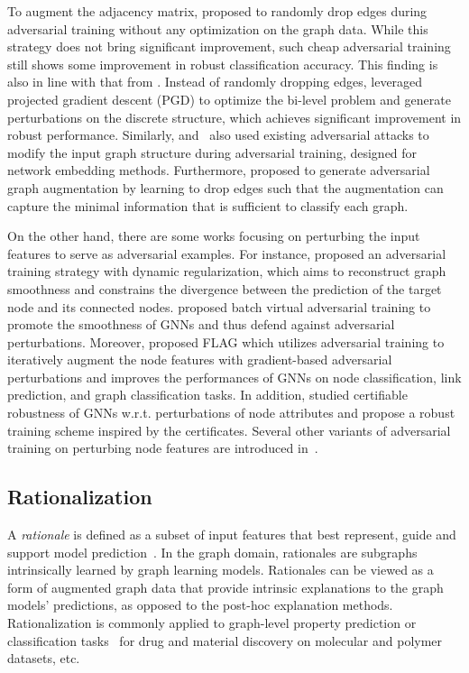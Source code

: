 \documentclass[11pt]{article}
\begin{document}
To augment the adjacency matrix, \citet{dai2018adversarial} proposed to randomly drop edges during adversarial training without any optimization on the graph data. While this strategy does not bring significant improvement, such cheap adversarial training still shows some improvement in robust classification accuracy. This finding is also in line with that from \citet{zugner2020certifiable}. Instead of randomly dropping edges, \citet{xu2019topology} leveraged projected gradient descent (PGD) to optimize the bi-level problem and generate perturbations on the discrete structure, which achieves significant improvement in robust performance. Similarly, \citet{chen2019can} and~\citet{dai2019adversarial} also used existing adversarial attacks to modify the input graph structure during adversarial training, designed for network embedding methods. Furthermore, \citet{suresh2021adversarial} proposed to generate adversarial graph augmentation by learning to drop edges such that the augmentation can capture the minimal information that is sufficient to classify each graph. 

On the other hand, there are some works focusing on perturbing the input features to serve as adversarial examples. For instance, \citet{feng2019graph} proposed an adversarial training strategy with dynamic regularization, which aims to reconstruct graph smoothness and constrains the divergence between the prediction of the target node and its connected nodes. \citet{deng2019batch} proposed batch virtual adversarial training to promote the smoothness of GNNs and thus defend against adversarial perturbations. Moreover, \citet{kong2022robust} proposed FLAG which utilizes adversarial training to iteratively augment the node features with gradient-based adversarial perturbations and improves the performances of GNNs on node classification, link prediction, and graph classification tasks. In addition, \citet{zugner2019certifiable} studied certifiable robustness of GNNs w.r.t. perturbations of node attributes and propose a robust training scheme inspired by the certificates.
Several other variants of adversarial training on perturbing node features are introduced in~\cite{wang2019graphdefense-adv-training,hu2021robust}.  

\subsection{Rationalization}
\label{sec:tong_rat}
A \emph{rationale} is defined as a subset of input features that best represent, guide and support model prediction~\cite{liu2022graph}. In the graph domain, rationales are subgraphs intrinsically learned by graph learning models. Rationales can be viewed as a form of augmented graph data that provide intrinsic explanations to the graph models' predictions, as opposed to the post-hoc explanation methods. 
Rationalization is commonly applied to graph-level property prediction or classification tasks~\cite{wu2020generalization,liu2022graph, you2020graph, chenlearning, miao2022interpretable, li2022learning} for drug and material discovery on molecular and polymer datasets, etc. 
\end{document}
